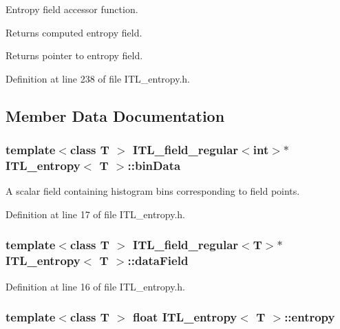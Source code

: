 Entropy field accessor function. 

Returns computed entropy field. \begin{DoxyReturn}{Returns}
pointer to entropy field. 
\end{DoxyReturn}


Definition at line 238 of file ITL\_\-entropy.h.



\subsection{Member Data Documentation}
\hypertarget{classITL__entropy_ae719783c7a6ae4481b711a1caf9e3ded}{
\subsubsection[{binData}]{\setlength{\rightskip}{0pt plus 5cm}template$<$class T $>$ {\bf ITL\_\-field\_\-regular}$<$int$>$$\ast$ {\bf ITL\_\-entropy}$<$ T $>$::{\bf binData}}}
\label{classITL__entropy_ae719783c7a6ae4481b711a1caf9e3ded}


A scalar field containing histogram bins corresponding to field points. 



Definition at line 17 of file ITL\_\-entropy.h.

\hypertarget{classITL__entropy_aa37a62d817f8cd335b63d4d9a9239e10}{
\subsubsection[{dataField}]{\setlength{\rightskip}{0pt plus 5cm}template$<$class T $>$ {\bf ITL\_\-field\_\-regular}$<$T$>$$\ast$ {\bf ITL\_\-entropy}$<$ T $>$::{\bf dataField}}}
\label{classITL__entropy_aa37a62d817f8cd335b63d4d9a9239e10}


Definition at line 16 of file ITL\_\-entropy.h.

\hypertarget{classITL__entropy_afea389e705dfeb2a6924a84e9055777d}{
\subsubsection[{entropy}]{\setlength{\rightskip}{0pt plus 5cm}template$<$class T $>$ float {\bf ITL\_\-entropy}$<$ T $>$::{\bf entropy}}}
\label{classITL__entropy_afea389e705dfeb2a6924a84e9055777d}


